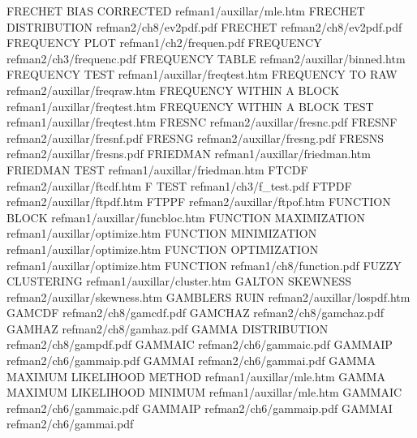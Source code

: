 FRECHET BIAS CORRECTED                  refman1/auxillar/mle.htm
FRECHET DISTRIBUTION                    refman2/ch8/ev2pdf.pdf
FRECHET                                 refman2/ch8/ev2pdf.pdf
FREQUENCY PLOT                          refman1/ch2/frequen.pdf
FREQUENCY                               refman2/ch3/frequenc.pdf
FREQUENCY TABLE                         refman2/auxillar/binned.htm
FREQUENCY TEST                          refman1/auxillar/freqtest.htm
FREQUENCY TO RAW                        refman2/auxillar/freqraw.htm
FREQUENCY WITHIN A BLOCK                refman1/auxillar/freqtest.htm
FREQUENCY WITHIN A BLOCK TEST           refman1/auxillar/freqtest.htm
FRESNC                                  refman2/auxillar/fresnc.pdf
FRESNF                                  refman2/auxillar/fresnf.pdf
FRESNG                                  refman2/auxillar/fresng.pdf
FRESNS                                  refman2/auxillar/fresns.pdf
FRIEDMAN                                refman1/auxillar/friedman.htm
FRIEDMAN TEST                           refman1/auxillar/friedman.htm
FTCDF                                   refman2/auxillar/ftcdf.htm
F TEST                                  refman1/ch3/f_test.pdf
FTPDF                                   refman2/auxillar/ftpdf.htm
FTPPF                                   refman2/auxillar/ftpof.htm
FUNCTION BLOCK                          refman1/auxillar/funcbloc.htm
FUNCTION MAXIMIZATION                   refman1/auxillar/optimize.htm
FUNCTION MINIMIZATION                   refman1/auxillar/optimize.htm
FUNCTION OPTIMIZATION                   refman1/auxillar/optimize.htm
FUNCTION                                refman1/ch8/function.pdf
FUZZY CLUSTERING                        refman1/auxillar/cluster.htm
GALTON SKEWNESS                         refman2/auxillar/skewness.htm
GAMBLERS RUIN                           refman2/auxillar/lospdf.htm
GAMCDF                                  refman2/ch8/gamcdf.pdf
GAMCHAZ                                 refman2/ch8/gamchaz.pdf
GAMHAZ                                  refman2/ch8/gamhaz.pdf
GAMMA DISTRIBUTION                      refman2/ch8/gampdf.pdf
GAMMAIC                                 refman2/ch6/gammaic.pdf
GAMMAIP                                 refman2/ch6/gammaip.pdf
GAMMAI                                  refman2/ch6/gammai.pdf
GAMMA MAXIMUM LIKELIHOOD METHOD         refman1/auxillar/mle.htm
GAMMA MAXIMUM LIKELIHOOD MINIMUM        refman1/auxillar/mle.htm
GAMMAIC                                 refman2/ch6/gammaic.pdf
GAMMAIP                                 refman2/ch6/gammaip.pdf
GAMMAI                                  refman2/ch6/gammai.pdf
